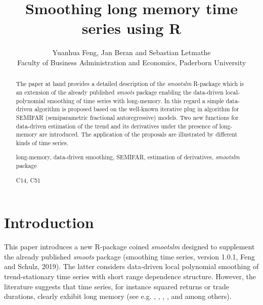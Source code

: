 \documentclass[12pt]{article}
\begin{document}
\title{Smoothing long memory time series using R}
\author{Yuanhua Feng, Jan Beran and Sebastian Letmathe\\ Faculty of Business Administration and Economics, Paderborn University}
\maketitle









\begin{abstract}
\noindent 
The paper at hand provides a detailed description of the \textit{smootslm} R-package which is an extension of the already published \textit{smoots} package enabling the data-driven local-polynomial smoothing of time series with long-memory. In this regard a simple data-driven algorithm is proposed based on the well-known iterative plug in algorithm for SEMIFAR (semiparametric fractional autoregressive) models. Two new functions for data-driven estimation of the trend and its derivatives under the presence of long-memory are introduced. The application of the proposals are illustrated by different kinds of time series. 

  
%

\vspace{.3cm}

 long-memory, data-driven smoothing, SEMIFAR, estimation of derivatives, \textit{smootslm} package


\vspace{.3cm}

 C14, C51
\end{abstract}

\newpage

\vspace{.5cm}


\section{Introduction}
This paper introduces a new R-package coined \textit{smootslm} designed to supplement the already published \textit{smoots} package (smoothing time series, version 1.0.1, Feng and Schulz, 2019). The latter considers data-driven local polynomial smoothing of trend-stationary time series with short range dependence structure. However, the literature suggests that time series, for instance squared returns or trade durations, clearly exhibit long memory (see e.g. \cite{ding1993long}, \cite{ding1996modeling}, \cite{andersen1997intraday}, \cite{andersen1999forecasting}, \cite{cotter2005uncovering} and \cite{beran2015modelling} among others).  
  
\end{document}
